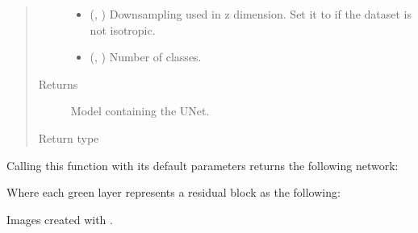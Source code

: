 \documentclass[letterpaper,10pt,english]{sphinxmanual}
\begin{document}
\begin{fulllineitems}
\begin{quote}
\begin{description}
\begin{itemize}
\item {} 
 (, ) \textendash{} Downsampling used in z dimension. Set it to  if the dataset is not isotropic.

\item {} 
 (, ) \textendash{} Number of classes.

\end{itemize}

\item[{Returns}] \leavevmode
{} \textendash{} Model containing the U\sphinxhyphen{}Net.

\item[{Return type}] \leavevmode
{}

\end{description}\end{quote}

Calling this function with its default parameters returns the following network:


Where each green layer represents a residual block as the following:


Images created with .

\end{fulllineitems}

\end{document}
